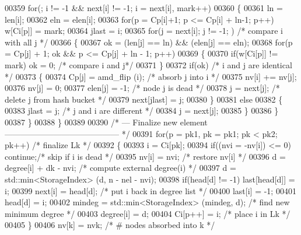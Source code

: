 \begin{DoxyCode}
00359       \textcolor{keywordflow}{for}(; i != -1 && next[i] != -1; i = next[i], mark++)
00360       \{
00361         ln = len[i];
00362         eln = elen[i];
00363         \textcolor{keywordflow}{for}(p = Cp[i]+1; p <= Cp[i] + ln-1; p++) w[Ci[p]] = mark;
00364         jlast = i;
00365         \textcolor{keywordflow}{for}(j = next[i]; j != -1; ) \textcolor{comment}{/* compare i with all j */}
00366         \{
00367           ok = (len[j] == ln) && (elen[j] == eln);
00368           \textcolor{keywordflow}{for}(p = Cp[j] + 1; ok && p <= Cp[j] + ln - 1; p++)
00369           \{
00370             \textcolor{keywordflow}{if}(w[Ci[p]] != mark) ok = 0;    \textcolor{comment}{/* compare i and j*/}
00371           \}
00372           \textcolor{keywordflow}{if}(ok)                     \textcolor{comment}{/* i and j are identical */}
00373           \{
00374             Cp[j] = amd\_flip (i);  \textcolor{comment}{/* absorb j into i */}
00375             nv[i] += nv[j];
00376             nv[j] = 0;
00377             elen[j] = -1;         \textcolor{comment}{/* node j is dead */}
00378             j = next[j];          \textcolor{comment}{/* delete j from hash bucket */}
00379             next[jlast] = j;
00380           \}
00381           \textcolor{keywordflow}{else}
00382           \{
00383             jlast = j;             \textcolor{comment}{/* j and i are different */}
00384             j = next[j];
00385           \}
00386         \}
00387       \}
00388     \}
00389     
00390     \textcolor{comment}{/* --- Finalize new element------------------------------------------ */}
00391     \textcolor{keywordflow}{for}(p = pk1, pk = pk1; pk < pk2; pk++)   \textcolor{comment}{/* finalize Lk */}
00392     \{
00393       i = Ci[pk];
00394       \textcolor{keywordflow}{if}((nvi = -nv[i]) <= 0) \textcolor{keywordflow}{continue};\textcolor{comment}{/* skip if i is dead */}
00395       nv[i] = nvi;                      \textcolor{comment}{/* restore nv[i] */}
00396       d = degree[i] + dk - nvi;         \textcolor{comment}{/* compute external degree(i) */}
00397       d = std::min<StorageIndex> (d, n - nel - nvi);
00398       \textcolor{keywordflow}{if}(head[d] != -1) last[head[d]] = i;
00399       next[i] = head[d];               \textcolor{comment}{/* put i back in degree list */}
00400       last[i] = -1;
00401       head[d] = i;
00402       mindeg = std::min<StorageIndex> (mindeg, d);       \textcolor{comment}{/* find new minimum degree */}
00403       degree[i] = d;
00404       Ci[p++] = i;                      \textcolor{comment}{/* place i in Lk */}
00405     \}
00406     nv[k] = nvk;                      \textcolor{comment}{/* # nodes absorbed into k */}

\end{DoxyCode}

